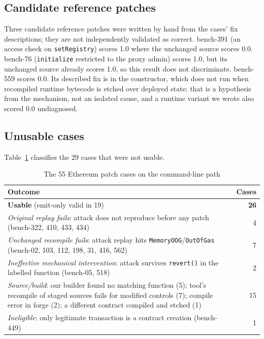 \documentclass[conference]{IEEEtran}
\newcommand{\code}[1]{\texttt{#1}}
\begin{document}
\subsection{Candidate reference patches}
Three candidate reference patches were written by hand from the cases' fix descriptions; they are not independently validated as correct. bench-391 (an access check on \code{setRegistry}) scores 1.0 where the unchanged source scores 0.0. bench-76 (\code{initialize} restricted to the proxy admin) scores 1.0, but its unchanged source already scores 1.0, so this result does not discriminate. bench-559 scores 0.0. Its described fix is in the constructor, which does not run when recompiled runtime bytecode is etched over deployed state; that is a hypothesis from the mechanism, not an isolated cause, and a runtime variant we wrote also scored 0.0 undiagnosed.

\subsection{Unusable cases}
\label{sec:excl}
Table~\ref{tab:usable} classifies the 29 cases that were not usable.

\begin{table}[t]
\caption{The 55 Ethereum patch cases on the command-line path}
\label{tab:usable}
\centering
\footnotesize
\setlength{\tabcolsep}{3pt}
\begin{tabular}{@{}p{}r@{}}
\toprule
Outcome & Cases \\
\midrule
\textbf{Usable} (emit-only valid in 19) & \textbf{26} \\
\midrule
\emph{Original replay fails}: attack does not reproduce before any patch (bench-322, 410, 433, 434) & 4 \\
\emph{Unchanged recompile fails}: attack replay hits \code{MemoryOOG}/\code{OutOfGas} (bench-02, 103, 112, 198, 31, 416, 562) & 7 \\
\emph{Ineffective mechanical intervention}: attack survives \code{revert()} in the labelled function (bench-05, 518) & 2 \\
\emph{Source/build}: our builder found no matching function (5); tool's recompile of staged sources fails for modified controls (7); compile error in forge (2); a different contract compiled and etched (1) & 15 \\
\emph{Ineligible}: only legitimate transaction is a contract creation (bench-449) & 1 \\
\bottomrule
\end{tabular}
\end{table}
\end{document}
